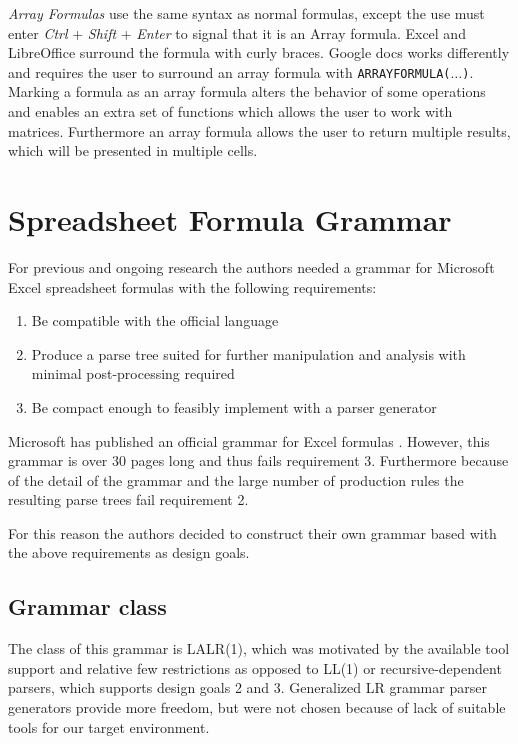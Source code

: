 \documentclass[conference]{IEEEtran}
\begin{document}
\emph{Array Formulas} use the same syntax as normal formulas, except the use must enter \emph{Ctrl} + \emph{Shift} + \emph{Enter} to signal that it is an Array formula.
Excel and LibreOffice surround the formula with curly braces.
Google docs works differently and requires the user to surround an array formula with \texttt{ARRAYFORMULA($\ldots$)}.
Marking a formula as an array formula alters the behavior of some operations and enables an extra set of functions which allows the user to work with matrices.
Furthermore an array formula allows the user to return multiple results, which will be presented in multiple cells.

\section{Spreadsheet Formula Grammar}
\label{section:grammar}

For previous and ongoing research the authors needed a grammar for Microsoft Excel spreadsheet formulas with the following requirements:

\label{sec:designgoals}
\begin{enumerate}
\item Be compatible with the official language
\item Produce a parse tree suited for further manipulation and analysis with minimal post-processing required
\item Be compact enough to feasibly implement with a parser generator
\end{enumerate}

Microsoft has published an official grammar for Excel formulas \cite{ExcelOfficialGrammar}.
However, this grammar is over 30 pages long and thus fails requirement 3.
Furthermore because of the detail of the grammar and the large number of production rules the resulting parse trees fail requirement 2.

For this reason the authors decided to construct their own grammar based with the above requirements as design goals.

\subsection{Grammar class}

The class of this grammar is LALR(1), which was motivated by the available tool support and relative few restrictions as opposed to LL(1) or recursive-dependent parsers, which supports design goals 2 and 3.
Generalized LR grammar parser generators provide more freedom, but were not chosen because of lack of suitable tools for our target environment.
\end{document}
